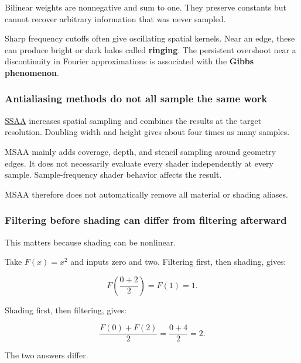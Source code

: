 Bilinear weights are nonnegative and sum to one. They preserve constants but cannot recover arbitrary information that was never sampled.

Sharp frequency cutoffs often give oscillating spatial kernels. Near an edge, these can produce bright or dark halos called \textbf{ringing}. The persistent overshoot near a discontinuity in Fourier approximations is associated with the \textbf{Gibbs phenomenon}.

\subsubsection{Antialiasing methods do not all sample the same work}\label{04-visual-computing-ii-ch043-antialiasing-methods-do-not-all-sample-the-same-work}

\hypertarget{04-visual-computing-ii-ch043-antialiasing-methods-do-not-all-sample-the-same-work}{}

\hyperref[appendix-4192b2bdd21e]{SSAA} increases spatial sampling and combines the results at the target resolution. Doubling width and height gives about four times as many samples.

MSAA mainly adds coverage, depth, and stencil sampling around geometry edges. It does not necessarily evaluate every shader independently at every sample. Sample-frequency shader behavior affects the result.

MSAA therefore does not automatically remove all material or shading aliases.

\subsubsection{Filtering before shading can differ from filtering afterward}\label{04-visual-computing-ii-ch043-filtering-before-shading-can-differ-from-filtering-afterward}

\hypertarget{04-visual-computing-ii-ch043-filtering-before-shading-can-differ-from-filtering-afterward}{}

This matters because shading can be nonlinear.

Take \(F(x)=x^2\) and inputs zero and two. Filtering first, then shading, gives:

\[
F\left(\frac{0+2}{2}\right)=F(1)=1.
\]

Shading first, then filtering, gives:

\[
\frac{F(0)+F(2)}2=\frac{0+4}2=2.
\]

The two answers differ.

